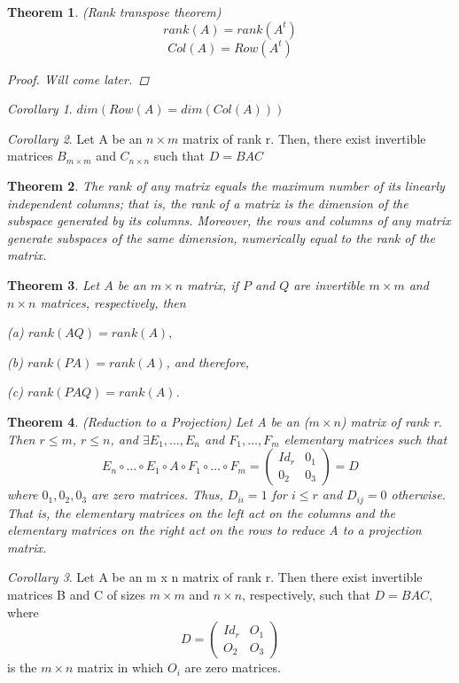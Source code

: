 \documentclass[12pt]{article}
\newtheorem{theorem}{Theorem}[section]
\theoremstyle{definition}
\theoremstyle{remark}
\newtheorem{corollary}{Corollary}[theorem]
\begin{document}
\begin{theorem}(Rank transpose theorem)
    $$rank(A) = rank(A^t)$$
    $$Col(A) = Row(A^t)$$

    \begin{proof}
        Will come later.
    \end{proof}
\end{theorem}
\begin{corollary}
    $dim(Row(A) = dim(Col(A)))$
\end{corollary}
\begin{corollary}
    Let A be an $n\times m$ matrix of rank r. Then, there exist invertible matrices $B_{m\times m}$ and $C_{n \times n}$ such that
    $D = BAC$
\end{corollary}
\begin{theorem}
    The rank of any matrix equals the maximum number of its linearly independent columns; that is, 
    the rank of a matrix is the dimension of the subspace generated by its columns. Moreover, the rows and columns of any matrix generate subspaces of the same
    dimension, numerically equal to the rank of the matrix.
\end{theorem}
\begin{theorem}
    Let $A$ be an $m \times n$ matrix, if $P$ and $Q$ are invertible $m \times m$ and $n\times n$ matrices, respectively, then

    (a) $rank(AQ) = rank(A),$

    (b) $rank(PA) = rank(A)$, and therefore,

    (c) $rank(PAQ) = rank(A)$.
\end{theorem}
\begin{theorem}(Reduction to a Projection)
    Let A be an ($m \times n$) matrix of rank r. Then $r \leq m$, $r \leq n$, and $\exists E_1, \hdots , E_n$ and $F_1, \hdots , F_m$ elementary matrices such that 
    $$E_n \circ \hdots \circ E_1 \circ A \circ F_1 \circ \hdots \circ F_m = \begin{pmatrix}
        Id_r & 0_1\\0_2&0_3
    \end{pmatrix} = D$$
    where $0_1, 0_2,0_3$ are zero matrices. Thus, $D_{ii} =1 $ for $i\leq r$ and $D_{ij} = 0$ otherwise. 
    That is, the elementary matrices on the left act on the columns and the elementary matrices on the right act
    on the rows to reduce A to a projection matrix. 
\end{theorem}
\begin{corollary}
    Let A be an m x n matrix of rank r. Then there exist
invertible matrices B and C of sizes $m\times m$ and $n \times n$, respectively, such that  $D = BAC$, where
$$D =\begin{pmatrix}
    Id_r & O_1 \\O_2 &O_3 
\end{pmatrix} $$
is the $m\times n$ matrix in which $O_i$ are zero matrices.
\end{corollary}
\end{document}
